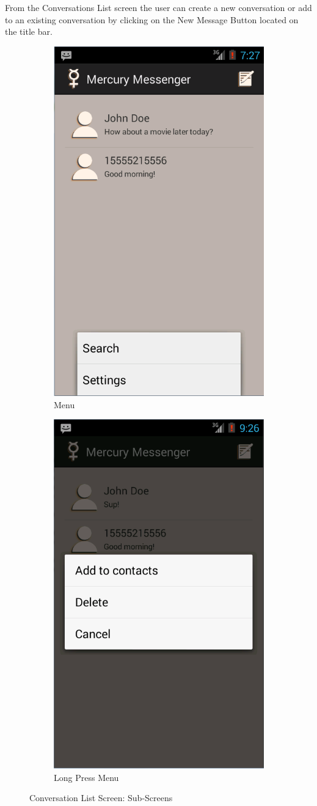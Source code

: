 \documentclass{article}
\begin{document}
\par From the Conversations List screen the user can create a new conversation or add to an existing conversation by clicking on the New Message Button located on the title bar. 


\begin{figure}[h!]
\centering
	\begin{subfigure}[b]{0.49\textwidth}
		\includegraphics[width=.49\textwidth]{"./Screen_shots/Conversation_screen_Menu"}{}
		\caption{Menu}
		\label{fig:MainScreenMenu}
	\end{subfigure} %
	\begin{subfigure}[b]{0.49\textwidth}
\includegraphics[width=.49\textwidth]{"./Screen_shots/Main_Screen_Long_Press"}{}
\caption{Long Press Menu}
\label{fig:MainScreenLong}
	\end{subfigure}
	\caption{Conversation List Screen: Sub-Screens}

\end{figure}
\end{document}
